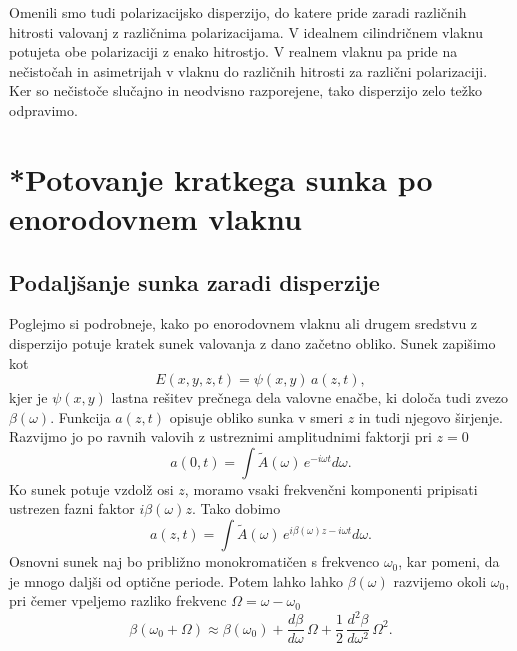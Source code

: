 \begin{remark}
 Omenili smo tudi polarizacijsko disperzijo, do katere pride zaradi različnih hitrosti valovanj
 z različnima polarizacijama. V idealnem cilindričnem vlaknu potujeta obe polarizaciji
 z enako hitrostjo. V realnem vlaknu pa 
 pride na nečistočah in asimetrijah v vlaknu do različnih hitrosti za različni polarizaciji. 
 Ker so nečistoče slučajno in neodvisno razporejene, tako disperzijo zelo težko odpravimo.
\end{remark}

\section{*Potovanje kratkega sunka po enorodovnem vlaknu}
\label{chap:sunvl}
\subsection*{Podaljšanje sunka zaradi disperzije}
Poglejmo si podrobneje, kako po enorodovnem vlaknu ali drugem
sredstvu z disperzijo potuje kratek sunek valovanja z dano začetno obliko.
Sunek zapišimo kot  
\begin{equation}
E\left(x, y, z, t\right)=\psi\left(x,y\right)\, a\left(z,t\right),
\label{9.61}
\end{equation}
kjer je $\psi\left(x,y\right)$ lastna rešitev prečnega dela valovne
enačbe, ki določa tudi zvezo $\beta\left(\omega\right)$. 
Funkcija $a\left(z,t\right)$ opisuje obliko sunka v smeri $z$ in tudi njegovo
širjenje. Razvijmo jo po ravnih valovih z ustreznimi amplitudnimi faktorji 
pri $z=0$ 
\begin{equation}
a\left(0,t\right)=\int \tilde{A}(\omega)\, e^{- i\omega t}d\omega.
\label{9.62}
\end{equation}
Ko sunek potuje vzdolž osi $z$, moramo vsaki frekvenčni komponenti pripisati
ustrezen fazni faktor $i \beta (\omega) z$. Tako dobimo 
\begin{equation}
a\left(z,t\right)=\int \tilde{A}(\omega)\, e^{i \beta (\omega) z - i\omega t}d\omega.
\label{9.62f}
\end{equation}
Osnovni sunek naj bo približno monokromatičen s frekvenco $\omega_{0}$,
kar pomeni, da je mnogo daljši od optične periode. Potem lahko lahko $\beta(\omega)$
razvijemo okoli $\omega_{0}$, pri čemer vpeljemo razliko frekvenc $\Omega = \omega - \omega_0$
\begin{equation}
\beta(\omega_0 + \Omega) \approx \beta(\omega_{0})
+\frac{d\beta}{d\omega}\,\Omega+\frac{1}{2}\,\frac{d^{2}\beta}{d\omega^{2}}\,\Omega^{2}.
\label{9.62c}
\end{equation}
